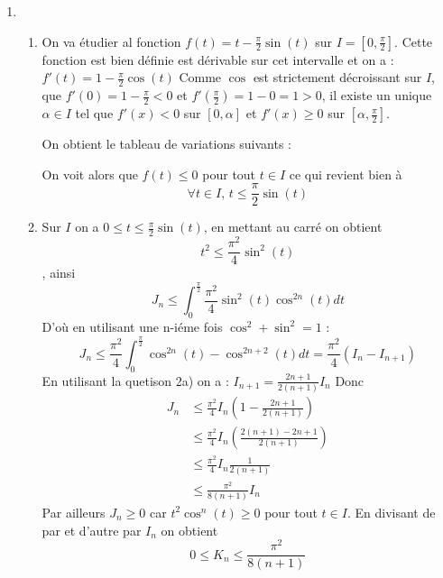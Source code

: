 \documentclass[a4paper, 11pt,reqno]{article}
\begin{document}
\begin{correction}
\begin{enumerate}
\begin{enumerate}
\end{enumerate}

\item \begin{enumerate}
\item On  va étudier al fonction $f(t) = t- \frac{\pi}{2} \sin(t)$ sur $I=[0,\frac{\pi}{2}]$. Cette fonction est bien définie est dérivable sur cet intervalle et on  a : $f'(t)=1 -\frac{\pi}{2}\cos(t)$
Comme $\cos$ est strictement décroissant sur $I$, que $f'(0) =1-\frac{\pi}{2}<0$ et $f'(\frac{\pi}{2}) =1-0=1>0 $, il existe un unique $\alpha\in I$ tel que $f'(x)<0 $ sur $[0,\alpha]$ et $f'(x)\geq 0 $ sur $[\alpha,\frac{\pi}{2}]$. 

On obtient le tableau de variations suivants : 

\begin{center}
\end{center}
 
 On voit alors que $f(t)\leq 0$ pour tout $t\in I$ ce qui revient bien à 
 $$ \forall t \in  I, 
 \, t\leq \frac{\pi}{2 }\sin(t)$$
\item Sur $I$ on a $0\leq t \leq  \frac{\pi}{2 }\sin(t)$, en mettant au carré on obtient $$t^2 \leq  \frac{\pi^2}{4 }\sin^2(t)$$, ainsi 
$$J_n \leq \int_0^{\frac{\pi}{2}}   \frac{\pi^2}{4 }\sin^2(t) \cos^{2n}(t) dt$$
D'où en utilisant une n-iéme fois $\cos^2+\sin^2=1$ :
$$J_n \leq \frac{\pi^2}{4 }  \int_0^{\frac{\pi}{2}}   \cos^{2n}(t) - \cos^{2n+2}(t)   dt  = \frac{\pi^2}{4} (I_n-I_{n+1})$$
En utilisant la quetison 2a) on a :
$I_{n+1} = \frac{2n+1}{2(n+1)}I_n$ 
Donc 
\begin{align*}
J_n &\leq  \frac{\pi^2}{4} I_n \left( 1 - \frac{2n+1}{2(n+1)}\right)\\
			&\leq  \frac{\pi^2}{4} I_n \left(   \frac{2(n+1)- 2n+1}{2(n+1)}\right)\\
			&\leq  \frac{\pi^2}{4} I_n  \frac{1}{2(n+1)}\\
			&\leq  \frac{\pi^2}{8(n+1)} I_n  
\end{align*}
Par ailleurs $J_n\geq 0$ car $t^2 \cos^n(t)\geq 0$  pour tout $t\in I$. 
En divisant de par et d'autre par $I_n$ on  obtient 
$$0\leq K_n \leq   \frac{\pi^2}{8(n+1)} $$


\end{enumerate}
\end{enumerate}
\end{correction}
\end{document}
